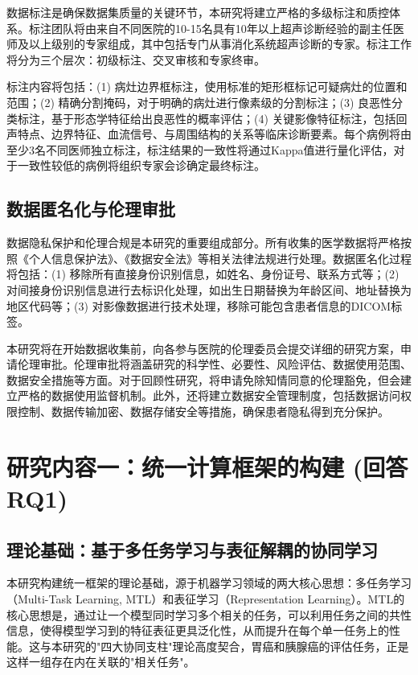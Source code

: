 数据标注是确保数据集质量的关键环节，本研究将建立严格的多级标注和质控体系。标注团队将由来自不同医院的10-15名具有10年以上超声诊断经验的副主任医师及以上级别的专家组成，其中包括专门从事消化系统超声诊断的专家。标注工作将分为三个层次：初级标注、交叉审核和专家终审。

标注内容将包括：(1) 病灶边界框标注，使用标准的矩形框标记可疑病灶的位置和范围；(2) 精确分割掩码，对于明确的病灶进行像素级的分割标注；(3) 良恶性分类标注，基于形态学特征给出良恶性的概率评估；(4) 关键影像特征标注，包括回声特点、边界特征、血流信号、与周围结构的关系等临床诊断要素。每个病例将由至少3名不同医师独立标注，标注结果的一致性将通过Kappa值进行量化评估，对于一致性较低的病例将组织专家会诊确定最终标注。

\subsection{数据匿名化与伦理审批}

数据隐私保护和伦理合规是本研究的重要组成部分。所有收集的医学数据将严格按照《个人信息保护法》、《数据安全法》等相关法律法规进行处理。数据匿名化过程将包括：(1) 移除所有直接身份识别信息，如姓名、身份证号、联系方式等；(2) 对间接身份识别信息进行去标识化处理，如出生日期替换为年龄区间、地址替换为地区代码等；(3) 对影像数据进行技术处理，移除可能包含患者信息的DICOM标签。

本研究将在开始数据收集前，向各参与医院的伦理委员会提交详细的研究方案，申请伦理审批。伦理审批将涵盖研究的科学性、必要性、风险评估、数据使用范围、数据安全措施等方面。对于回顾性研究，将申请免除知情同意的伦理豁免，但会建立严格的数据使用监督机制。此外，还将建立数据安全管理制度，包括数据访问权限控制、数据传输加密、数据存储安全等措施，确保患者隐私得到充分保护。

\section{研究内容一：统一计算框架的构建 (回答RQ1)}

\subsection{理论基础：基于多任务学习与表征解耦的协同学习}

本研究构建统一框架的理论基础，源于机器学习领域的两大核心思想：多任务学习（Multi-Task Learning, MTL）和表征学习（Representation Learning）。MTL的核心思想是，通过让一个模型同时学习多个相关的任务，可以利用任务之间的共性信息，使得模型学习到的特征表征更具泛化性，从而提升在每个单一任务上的性能。这与本研究的"四大协同支柱"理论高度契合，胃癌和胰腺癌的评估任务，正是这样一组存在内在关联的"相关任务"。

